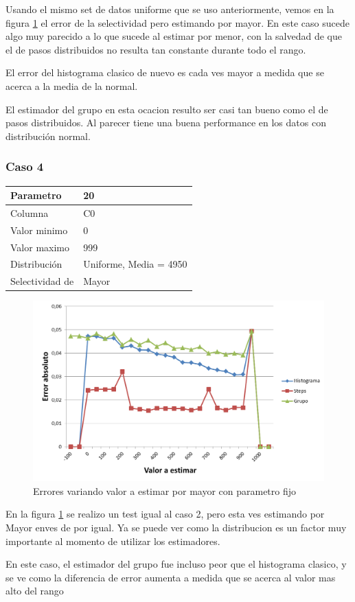 		Usando el mismo set de datos uniforme que se uso anteriormente, vemos en la figura \ref{fig:C0_variando_valor_greater} el error de la selectividad pero estimando por mayor. En este caso sucede algo muy parecido a lo que sucede al estimar por menor, con la salvedad de que el de pasos distribuidos no resulta tan constante durante todo el rango.
		
		El error del histograma clasico de nuevo es cada ves mayor a medida que se acerca a la media de la normal. 
		
		El estimador del grupo en esta ocacion resulto ser casi tan bueno como el de pasos distribuidos. Al parecer tiene una buena performance en los datos con distribuci\'on normal.

			\subsubsection*{Caso 4}
		
		\begin{tabular}{| l | l |}
		\hline
		Parametro & 20 \\
		\hline
		Columna & C0 \\
		\hline
		Valor minimo & 0 \\
		\hline
		Valor maximo & 999 \\
		\hline
		Distribuci\'on & Uniforme, Media = 4950 \\
		\hline
		Selectividad de & Mayor \\
		\hline
		\end{tabular}		

	\begin{figure}[H]
	  \begin{center}
	    \includegraphics[scale=.40]{imagenes/C0_variando_valor_greater.png}
	    \caption{Errores variando valor a estimar por mayor con parametro fijo} 
	    \label{fig:C0_variando_valor_greater}
	  \end{center}
	\end{figure}	

		En la figura \ref{fig:C0_variando_valor_greater} se realizo un test igual al caso 2, pero esta ves estimando por Mayor enves de por igual. Ya se puede ver como la distribucion es un factor muy importante al momento de utilizar los estimadores.
		
		En este caso, el estimador del grupo fue incluso peor que el histograma clasico, y se ve como la diferencia de error aumenta a medida que se acerca al valor mas alto del rango